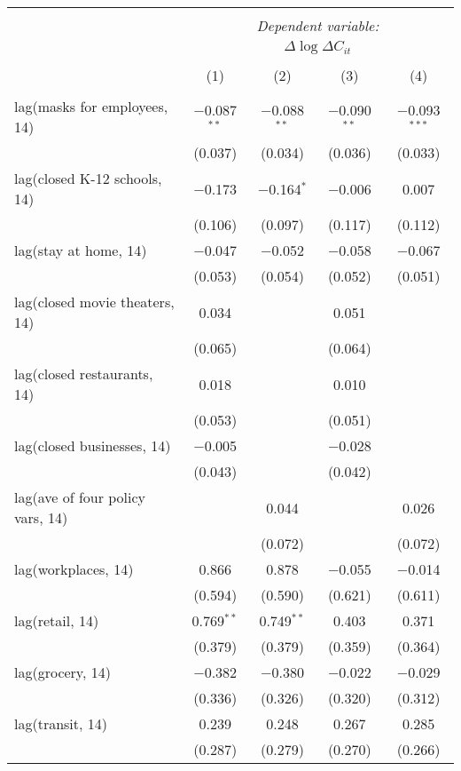 \begin{tabular}{@{\extracolsep{1pt}}lcccc} 
\\[-1.8ex]\hline 
\hline \\[-1.8ex] 
 & \multicolumn{4}{c}{\textit{Dependent variable:}} \\ 
\cline{2-5} 
 & \multicolumn{4}{c}{$\Delta \log \Delta C_{it}$} \\ 
\\[-1.8ex] & (1) & (2) & (3) & (4)\\ 
\hline \\[-1.8ex] 
 lag(masks for employees, 14) & $-$0.087$^{**}$ & $-$0.088$^{**}$ & $-$0.090$^{**}$ & $-$0.093$^{***}$ \\ 
  & (0.037) & (0.034) & (0.036) & (0.033) \\ 
  lag(closed K-12 schools, 14) & $-$0.173 & $-$0.164$^{*}$ & $-$0.006 & 0.007 \\ 
  & (0.106) & (0.097) & (0.117) & (0.112) \\ 
  lag(stay at home, 14) & $-$0.047 & $-$0.052 & $-$0.058 & $-$0.067 \\ 
  & (0.053) & (0.054) & (0.052) & (0.051) \\ 
  lag(closed movie theaters, 14) & 0.034 &  & 0.051 &  \\ 
  & (0.065) &  & (0.064) &  \\ 
  lag(closed restaurants, 14) & 0.018 &  & 0.010 &  \\ 
  & (0.053) &  & (0.051) &  \\ 
  lag(closed businesses, 14) & $-$0.005 &  & $-$0.028 &  \\ 
  & (0.043) &  & (0.042) &  \\ 
  lag(ave of four policy vars, 14) &  & 0.044 &  & 0.026 \\ 
  &  & (0.072) &  & (0.072) \\ 
  lag(workplaces, 14) & 0.866 & 0.878 & $-$0.055 & $-$0.014 \\ 
  & (0.594) & (0.590) & (0.621) & (0.611) \\ 
  lag(retail, 14) & 0.769$^{**}$ & 0.749$^{**}$ & 0.403 & 0.371 \\ 
  & (0.379) & (0.379) & (0.359) & (0.364) \\ 
  lag(grocery, 14) & $-$0.382 & $-$0.380 & $-$0.022 & $-$0.029 \\ 
  & (0.336) & (0.326) & (0.320) & (0.312) \\ 
  lag(transit, 14) & 0.239 & 0.248 & 0.267 & 0.285 \\ 
  & (0.287) & (0.279) & (0.270) & (0.266) \\ 

\end{tabular}
